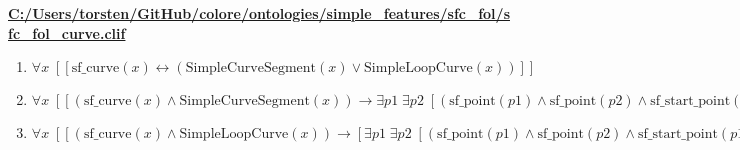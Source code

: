 \documentclass{article}
\begin{document}
\textbf{\url{C:/Users/torsten/GitHub/colore/ontologies/simple\_features/sfc\_fol/sfc\_fol\_curve.clif}}

\begin{enumerate}
\item $\forall x\;  \left[ \left[ \textrm{sf\_curve}(x) \leftrightarrow \left(\textrm{SimpleCurveSegment}(x) \lor \textrm{SimpleLoopCurve}(x)\right) \right] \right]$
\item $\forall x\;  \left[ \left[ \left(\textrm{sf\_curve}(x) \land \textrm{SimpleCurveSegment}(x)\right) \rightarrow \exists p1\; \exists p2\;  \left[ \left(\textrm{sf\_point}(p1) \land \textrm{sf\_point}(p2) \land \textrm{sf\_start\_point}(p1,x) \land \textrm{sf\_end\_point}(p2,x) \land \textrm{BCont}(p1,x) \land \textrm{BCont}(p2,x) \land \neg \left(\textrm{=}(p1,p2)\right)\right) \right] \right] \right]$
\item $\forall x\;  \left[ \left[ \left(\textrm{sf\_curve}(x) \land \textrm{SimpleLoopCurve}(x)\right) \rightarrow \left[ \exists p1\; \exists p2\;  \left[ \left(\textrm{sf\_point}(p1) \land \textrm{sf\_point}(p2) \land \textrm{sf\_start\_point}(p1,x) \land \textrm{sf\_end\_point}(p2,x)\right) \right] \rightarrow \textrm{=}(y,z) \right] \right] \right]$
\end{enumerate}
\end{document}
